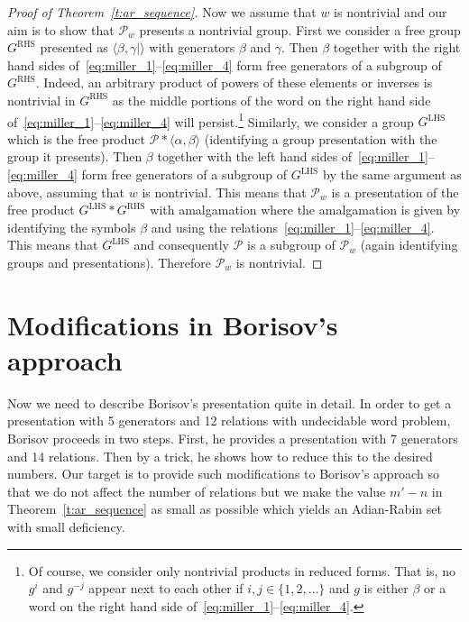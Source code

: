 \documentclass[10pt,a4paper]{article}
\theoremstyle{definition}
\theoremstyle{remark}
\DeclareMathOperator{\RHS}{RHS}
\DeclareMathOperator{\LHS}{LHS}
\newcommand\PP{\mathcal{P}}
\begin{document}
\begin{proof}[Proof of Theorem~\ref{t:ar_sequence}]
Now we assume that $w$ is nontrivial and our aim is to show that $\PP_w$
  presents a nontrivial group. First we consider a free group $G^{\RHS}$
  presented as $\langle \beta,
  \gamma| \rangle$ with generators $\beta$ and $\gamma$. Then
  $\beta$ together with the right hand sides
  of~\eqref{eq:miller_1}--\eqref{eq:miller_4} form free generators of a
  subgroup of $G^{\RHS}$. Indeed, an arbitrary product of powers of these elements or
  inverses is nontrivial in $G^{\RHS}$ as the middle portions of the word on
  the right hand side of~\eqref{eq:miller_1}--\eqref{eq:miller_4} will
  persist.\footnote{Of course, we consider only nontrivial products in reduced
  forms. That is, no $g^{i}$ and $g^{-j}$ appear next to each other if $i, j
  \in \{1, 2, \dots \}$ and $g$ is either $\beta$ or a word on the right hand
  side of~\eqref{eq:miller_1}--\eqref{eq:miller_4}.} Similarly, we consider a
  group $G^{\LHS}$ which is the free product $\PP * \langle \alpha, \beta
  \rangle$ (identifying a group presentation with the group it presents). Then
  $\beta$ together with the left hand sides
  of~\eqref{eq:miller_1}--\eqref{eq:miller_4} form free generators of a
  subgroup of $G^{\LHS}$ by the same argument as above, assuming that $w$ is
  nontrivial. This means that $\PP_w$ is a presentation of the free product
  $G^{\LHS} * G^{\RHS}$ with amalgamation where the amalgamation is given by
  identifying the symbols $\beta$ and using the
  relations~\eqref{eq:miller_1}--\eqref{eq:miller_4}. This means that
  $G^{\LHS}$ and consequently $\PP$ is a subgroup of $\PP_w$ (again identifying
  groups and presentations). Therefore $\PP_w$ is nontrivial.
\end{proof}


\section{Modifications in Borisov's approach}
\label{s:modify_borisov}


Now we need to describe Borisov's presentation quite in
detail. %
In order to get a
presentation with 5 generators and 12 relations with undecidable word problem,
Borisov proceeds in two steps. First, he provides a presentation with 7
generators and 14 relations. Then by a trick, he shows how to reduce this to
the desired numbers. Our target is to provide such modifications to Borisov's
approach so that we do not affect the number of relations but we make the value
$m' - n$ in Theorem~\ref{t:ar_sequence} as small as possible which yields an
Adian-Rabin set with small deficiency.
\end{document}
